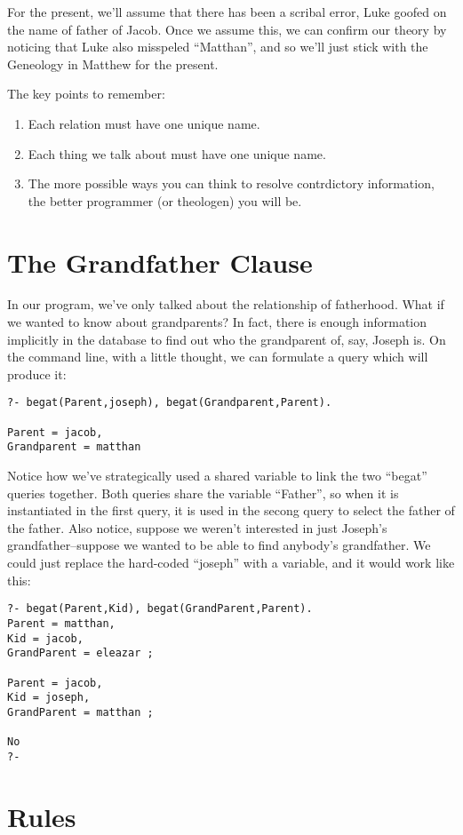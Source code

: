\documentclass{book}[9pt]
\begin{document}
For the present, we'll assume that there has been a scribal error,
Luke goofed on the name of father of Jacob.  Once we assume this, we
can confirm our theory by noticing that Luke also misspeled ``Matthan'',
and so we'll just stick with the Geneology in Matthew for the present.

The key points to remember:
\begin{enumerate}
\item Each relation must have one unique name.
\item Each thing we talk about must have one unique name.
\item The more possible ways you can think to resolve contrdictory
  information, the better programmer (or theologen) you will be.
\end{enumerate}

\section{The Grandfather Clause}

In our program, we've only talked about the relationship of
fatherhood.  What if we wanted to know about grandparents?  In fact,
there is enough information implicitly in the database to find out who
the grandparent of, say, Joseph is.  On the command line, with a
little thought, we can formulate a query which will produce it:
\begin{verbatim}
?- begat(Parent,joseph), begat(Grandparent,Parent).

Parent = jacob,
Grandparent = matthan
\end{verbatim}
\noindent Notice how we've strategically used a shared variable to
link the two ``begat'' queries together.  Both queries share the
variable ``Father'', so when it is instantiated in the first query, it
is used in the secong query to select the father of the father.  Also
notice, suppose we weren't interested in just Joseph's
grandfather--suppose we wanted to be able to find anybody's
grandfather.  We could just replace the hard-coded ``joseph'' with a
variable, and it would work like this:
\begin{verbatim}
?- begat(Parent,Kid), begat(GrandParent,Parent). 
Parent = matthan,
Kid = jacob,
GrandParent = eleazar ;

Parent = jacob,
Kid = joseph,
GrandParent = matthan ;

No
?- 
\end{verbatim}

\section{Rules}
\end{document}
